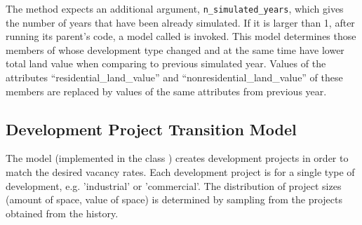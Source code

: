 The  method expects an additional argument, \verb|n_simulated_years|,
which gives the number of years that have been already simulated. If it is larger than 1,
after running its parent's code, a model \modelsindex called  is invoked. 
This model determines those members of  \datasetindex whose
development type changed and at the same time have lower total land value when
comparing to previous simulated year. Values of the attributes \attributesindex
``residential_land_value'' and ``nonresidential_land_value'' of these members
are replaced by values of the same attributes \attributesindex from previous year.

%
\subsection{Development Project Transition Model}
\modelsindex
%
\label{sec:development-project-transition-model}
%
The model \modelsindex (implemented in the class ) \modelsindex
creates development projects in order to match the desired vacancy rates. Each
development project is for a single type of development, e.g.  'industrial' or
'commercial'.  The distribution of project sizes (amount of space, value of
space) is determined by sampling from the projects obtained from the history.

